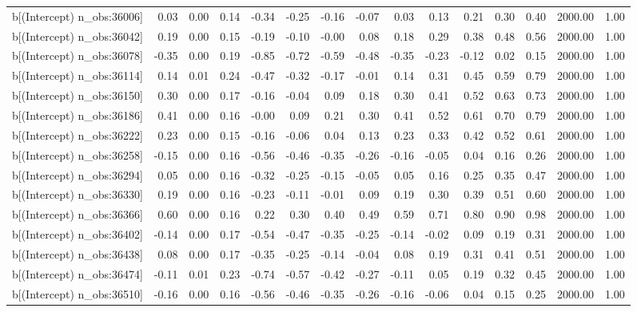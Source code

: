 \begin{table}[ht]
\begin{tabular}{rrrrrrrrrrrrrrr}
  b[(Intercept) n\_obs:36006] & 0.03 & 0.00 & 0.14 & -0.34 & -0.25 & -0.16 & -0.07 & 0.03 & 0.13 & 0.21 & 0.30 & 0.40 & 2000.00 & 1.00 \\ 
  b[(Intercept) n\_obs:36042] & 0.19 & 0.00 & 0.15 & -0.19 & -0.10 & -0.00 & 0.08 & 0.18 & 0.29 & 0.38 & 0.48 & 0.56 & 2000.00 & 1.00 \\ 
  b[(Intercept) n\_obs:36078] & -0.35 & 0.00 & 0.19 & -0.85 & -0.72 & -0.59 & -0.48 & -0.35 & -0.23 & -0.12 & 0.02 & 0.15 & 2000.00 & 1.00 \\ 
  b[(Intercept) n\_obs:36114] & 0.14 & 0.01 & 0.24 & -0.47 & -0.32 & -0.17 & -0.01 & 0.14 & 0.31 & 0.45 & 0.59 & 0.79 & 2000.00 & 1.00 \\ 
  b[(Intercept) n\_obs:36150] & 0.30 & 0.00 & 0.17 & -0.16 & -0.04 & 0.09 & 0.18 & 0.30 & 0.41 & 0.52 & 0.63 & 0.73 & 2000.00 & 1.00 \\ 
  b[(Intercept) n\_obs:36186] & 0.41 & 0.00 & 0.16 & -0.00 & 0.09 & 0.21 & 0.30 & 0.41 & 0.52 & 0.61 & 0.70 & 0.79 & 2000.00 & 1.00 \\ 
  b[(Intercept) n\_obs:36222] & 0.23 & 0.00 & 0.15 & -0.16 & -0.06 & 0.04 & 0.13 & 0.23 & 0.33 & 0.42 & 0.52 & 0.61 & 2000.00 & 1.00 \\ 
  b[(Intercept) n\_obs:36258] & -0.15 & 0.00 & 0.16 & -0.56 & -0.46 & -0.35 & -0.26 & -0.16 & -0.05 & 0.04 & 0.16 & 0.26 & 2000.00 & 1.00 \\ 
  b[(Intercept) n\_obs:36294] & 0.05 & 0.00 & 0.16 & -0.32 & -0.25 & -0.15 & -0.05 & 0.05 & 0.16 & 0.25 & 0.35 & 0.47 & 2000.00 & 1.00 \\ 
  b[(Intercept) n\_obs:36330] & 0.19 & 0.00 & 0.16 & -0.23 & -0.11 & -0.01 & 0.09 & 0.19 & 0.30 & 0.39 & 0.51 & 0.60 & 2000.00 & 1.00 \\ 
  b[(Intercept) n\_obs:36366] & 0.60 & 0.00 & 0.16 & 0.22 & 0.30 & 0.40 & 0.49 & 0.59 & 0.71 & 0.80 & 0.90 & 0.98 & 2000.00 & 1.00 \\ 
  b[(Intercept) n\_obs:36402] & -0.14 & 0.00 & 0.17 & -0.54 & -0.47 & -0.35 & -0.25 & -0.14 & -0.02 & 0.09 & 0.19 & 0.31 & 2000.00 & 1.00 \\ 
  b[(Intercept) n\_obs:36438] & 0.08 & 0.00 & 0.17 & -0.35 & -0.25 & -0.14 & -0.04 & 0.08 & 0.19 & 0.31 & 0.41 & 0.51 & 2000.00 & 1.00 \\ 
  b[(Intercept) n\_obs:36474] & -0.11 & 0.01 & 0.23 & -0.74 & -0.57 & -0.42 & -0.27 & -0.11 & 0.05 & 0.19 & 0.32 & 0.45 & 2000.00 & 1.00 \\ 
  b[(Intercept) n\_obs:36510] & -0.16 & 0.00 & 0.16 & -0.56 & -0.46 & -0.35 & -0.26 & -0.16 & -0.06 & 0.04 & 0.15 & 0.25 & 2000.00 & 1.00 \\ 

\end{tabular}
\end{table}
